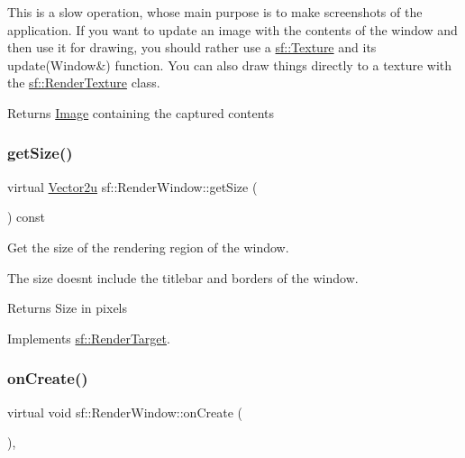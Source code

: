 This is a slow operation, whose main purpose is to make screenshots of the application. If you want to update an image with the contents of the window and then use it for drawing, you should rather use a \hyperlink{classsf_1_1_texture}{sf\+::\+Texture} and its update(\+Window\&) function. You can also draw things directly to a texture with the \hyperlink{classsf_1_1_render_texture}{sf\+::\+Render\+Texture} class.

\begin{DoxyReturn}{Returns}
\hyperlink{classsf_1_1_image}{Image} containing the captured contents 
\end{DoxyReturn}
\mbox{\label{classsf_1_1_render_window_ae3eacf93661c8068fca7a78d57dc7e14}} 
\subsubsection{\texorpdfstring{get\+Size()}{getSize()}}
{\footnotesize\ttfamily virtual \hyperlink{classsf_1_1_vector2}{Vector2u} sf\+::\+Render\+Window\+::get\+Size (\begin{DoxyParamCaption}{ }\end{DoxyParamCaption}) const\hspace{0.3cm}{\ttfamily [virtual]}}



Get the size of the rendering region of the window. 

The size doesn\textquotesingle{}t include the titlebar and borders of the window.

\begin{DoxyReturn}{Returns}
Size in pixels 
\end{DoxyReturn}


Implements \hyperlink{classsf_1_1_render_target_a2e5ade2457d9fb4c4907ae5b3d9e94a5}{sf\+::\+Render\+Target}.

\mbox{\label{classsf_1_1_render_window_a5bef0040b0fa87bed9fbd459c980d53a}} 
\subsubsection{\texorpdfstring{on\+Create()}{onCreate()}}
{\footnotesize\ttfamily virtual void sf\+::\+Render\+Window\+::on\+Create (\begin{DoxyParamCaption}{ }\end{DoxyParamCaption})\hspace{0.3cm}{\ttfamily [protected]}, {\ttfamily [virtual]}}



